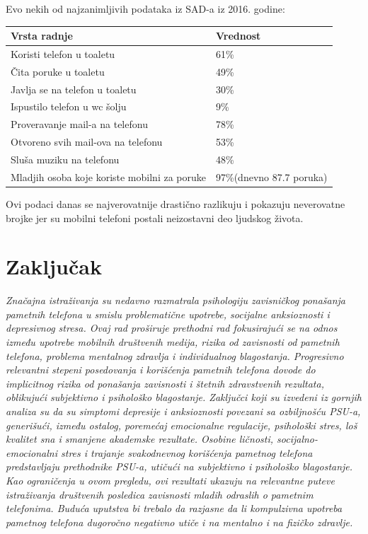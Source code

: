 \documentclass[a4paper]{article}
\begin{document}
Evo nekih od najzanimljivih podataka iz SAD-a iz 2016. godine:

\begin{center}
    \begin{tabular}{ |l|l|} 
    \hline
  Vrsta radnje&Vrednost\\
  \hline
  Koristi telefon u toaletu & 61\% \\
  Čita poruke u toaletu & 49\%   \\
  Javlja se na telefon u toaletu & 30\% \\
  Ispustilo telefon u wc šolju & 9\%  \\
  Proveravanje mail-a na telefonu & 78\% \\
  Otvoreno svih mail-ova na telefonu & 53\% \\
  Sluša muziku na telefonu & 48\% \\
  Mladjih osoba koje koriste mobilni za poruke & 97\%(dnevno 87.7 poruka) \\
  \hline  
   
    \hline
    \end{tabular}
\end{center}

Ovi podaci danas se najverovatnije drastično razlikuju i pokazuju neverovatne
brojke jer su mobilni telefoni postali neizostavni deo ljudskog života.

\section{Zaključak}

\textit{Značajna istraživanja su nedavno razmatrala psihologiju zavisničkog
ponašanja pametnih telefona u smislu problematične upotrebe,
socijalne anksioznosti i depresivnog stresa.
Ovaj rad proširuje prethodni rad fokusirajući se na odnos između
upotrebe mobilnih društvenih medija, rizika od zavisnosti od pametnih telefona,
problema mentalnog zdravlja i individualnog blagostanja.
Progresivno relevantni stepeni posedovanja i korišćenja pametnih telefona dovode
do implicitnog rizika od ponašanja zavisnosti i štetnih zdravstvenih rezultata,
oblikujući subjektivno i psihološko blagostanje. Zaključci koji su izvedeni
iz gornjih analiza su da su simptomi depresije i anksioznosti povezani sa
ozbiljnošću PSU-a, generišući, između ostalog, poremećaj emocionalne regulacije,
psihološki stres, loš kvalitet sna i smanjene akademske rezultate.
Osobine ličnosti, socijalno-emocionalni stres i trajanje svakodnevnog
korišćenja pametnog telefona predstavljaju prethodnike PSU-a,
utičući na subjektivno i psihološko blagostanje. Kao ograničenja u ovom pregledu,
ovi rezultati ukazuju na relevantne puteve istraživanja društvenih posledica
zavisnosti mladih odraslih o pametnim telefonima. Buduća uputstva bi trebalo
da razjasne da li kompulzivna upotreba pametnog telefona dugoročno negativno
utiče i na mentalno i na fizičko zdravlje.}
\end{document}
